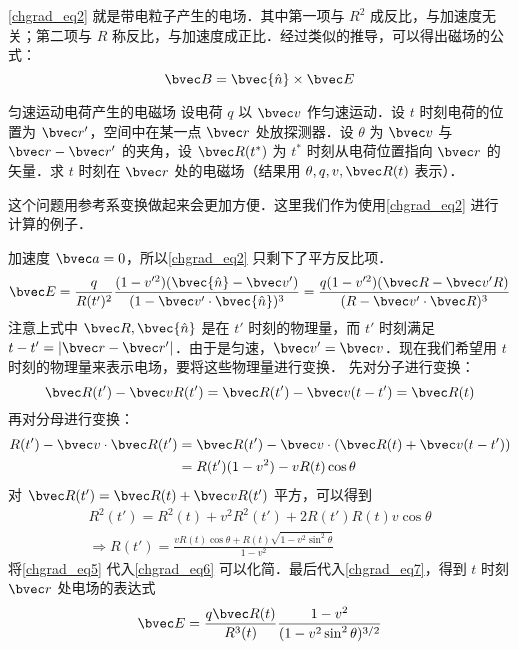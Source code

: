 \autoref{chgrad_eq2}  就是带电粒子产生的电场．其中第一项与 $R^2$ 成反比，与加速度无关；第二项与 $R$ 称反比，与加速度成正比．经过类似的推导，可以得出磁场的公式：
\begin{equation}
\bvec B=\bvec{\hat n} \times \bvec E
\end{equation}
\begin{example}{匀速运动电荷产生的电磁场}
设电荷 $q$ 以 $\bvec v$ 作匀速运动．设 $t$ 时刻电荷的位置为 $\bvec r'$，空间中在某一点 $\bvec r$ 处放探测器．设 $\theta$ 为 $\bvec v$ 与 $\bvec r-\bvec r'$ 的夹角，设 $\bvec R(t^*)$ 为 $t^*$ 时刻从电荷位置指向 $\bvec r$ 的矢量．求 $t$ 时刻在 $\bvec r$ 处的电磁场（结果用 $\theta,q,v,\bvec R(t)$ 表示）．

这个问题用参考系变换做起来会更加方便．这里我们作为使用\autoref{chgrad_eq2} 进行计算的例子．

加速度 $\bvec a=0$，所以\autoref{chgrad_eq2} 只剩下了平方反比项．
\begin{equation}\label{chgrad_eq7}
\bvec E=\frac{q}{R(t')^2}\frac{(1-v'^2)(\bvec{\hat n}-\bvec v')}{(1-\bvec v'\cdot \bvec{\hat n})^3}=\frac{q(1-v'^2)(\bvec R-\bvec v'R)}{(R-\bvec v'\cdot \bvec R)^3}
\end{equation}
注意上式中 $\bvec R,\bvec{\hat n}$ 是在 $t'$ 时刻的物理量，而 $t'$ 时刻满足 $t-t'=|\bvec r-\bvec r'|$．由于是匀速，$\bvec v'=\bvec v$．现在我们希望用 $t$ 时刻的物理量来表示电场，要将这些物理量进行变换．
先对分子进行变换：
\begin{equation}\label{chgrad_eq4}
\bvec R(t')-\bvec vR(t')=\bvec R(t')-\bvec v(t-t')=\bvec R(t)
\end{equation}
再对分母进行变换：
\begin{equation}\label{chgrad_eq6}
\begin{aligned}
R(t')-\bvec v\cdot \bvec R(t')&=\bvec R(t')-\bvec v\cdot(\bvec R(t)+\bvec v(t-t'))\\
&=R(t')(1-v^2)- v R(t)\cos\theta
\end{aligned}
\end{equation}
对 $\bvec R(t')=\bvec R(t)+\bvec vR(t')$ 平方，可以得到
\begin{equation}\label{chgrad_eq5}
\begin{aligned}
R^2(t')=R^2(t)+v^2R^2(t')+2R(t')R(t)v\cos \theta\\
\Rightarrow R(t')=\frac{vR(t)\cos \theta+R(t)\sqrt{1-v^2\sin^2\theta}}{1-v^2}
\end{aligned}
\end{equation}
将\autoref{chgrad_eq5} 代入\autoref{chgrad_eq6}  可以化简．最后代入\autoref{chgrad_eq7}，得到 $t$ 时刻 $\bvec r$ 处电场的表达式
\begin{equation}
\bvec E=\frac{q\bvec R(t)}{R^3(t)}\frac{1-v^2}{(1-v^2\sin^2\theta)^{3/2}}
\end{equation}


\end{example}
